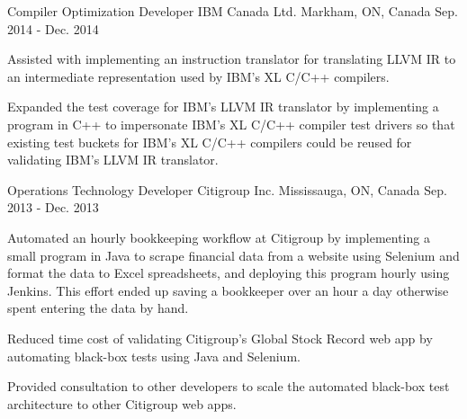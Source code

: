 

\begin{cventries}

  \cventry
    {Compiler Optimization Developer} %
    {IBM Canada Ltd.} %
    {Markham, ON, Canada} %
    {Sep. 2014 - Dec. 2014} %
    {
      \begin{cvitems} %
        \item {
          Assisted with implementing an instruction translator for translating LLVM IR to an
          intermediate representation used by IBM's XL C/C++ compilers.
        }
        \item {
          Expanded the test coverage for IBM's LLVM IR translator by implementing a program in C++
          to impersonate IBM's XL C/C++ compiler test drivers so that existing test buckets for
          IBM's XL C/C++ compilers could be reused for validating IBM's LLVM IR translator.
        }
      \end{cvitems}
    }

  \cventry
    {Operations Technology Developer} %
    {Citigroup Inc.} %
    {Mississauga, ON, Canada} %
    {Sep. 2013 - Dec. 2013} %
    {
      \begin{cvitems} %
        \item {
          Automated an hourly bookkeeping workflow at Citigroup by implementing a small program in
          Java to scrape financial data from a website using Selenium and format the data to Excel
          spreadsheets, and deploying this program hourly using Jenkins. This effort ended up
          saving a bookkeeper over an hour a day otherwise spent entering the data by hand.
        }
        \item {
          Reduced time cost of validating Citigroup's Global Stock Record web app by automating
          black-box tests using Java and Selenium.
        }
        \item {
          Provided consultation to other developers to scale the automated black-box test
          architecture to other Citigroup web apps.
        }
      \end{cvitems}
    }


\end{cventries}
